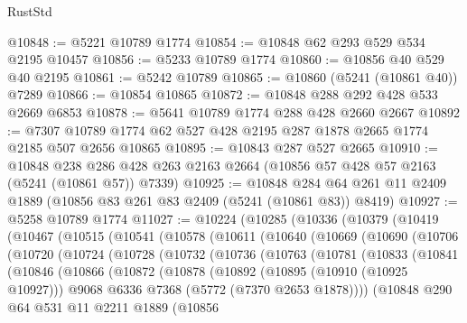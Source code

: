 \begin{lexlean}{RustStd}
\begin{coremodule}
@10848 := @5221 @10789 @1774
@10854 := @10848 @62 @293 @529 @534 @2195 @10457
@10856 := @5233 @10789 @1774
@10860 := @10856 @40 @529 @40 @2195
@10861 := @5242 @10789
@10865 := @10860 (@5241 (@10861 @40)) @7289
@10866 := @10854 @10865
@10872 := @10848 @288 @292 @428 @533 @2669 @6853
@10878 := @5641 @10789 @1774 @288 @428 @2660 @2667
@10892 := @7307 @10789 @1774 @62 @527 @428 @2195 @287 @1878 @2665 @1774 @2185 @507 @2656 @10865
@10895 := @10843 @287 @527 @2665
@10910 := @10848
    @238
    @286
    @428
    @263
    @2163
    @2664
    (@10856 @57 @428 @57 @2163 (@5241 (@10861 @57)) @7339)
@10925 := @10848
    @284
    @64
    @261
    @11
    @2409
    @1889
    (@10856 @83 @261 @83 @2409 (@5241 (@10861 @83)) @8419)
@10927 := @5258 @10789 @1774
@11027 := @10224
    (@10285
      (@10336
        (@10379
          (@10419
            (@10467
              (@10515
                (@10541
                  (@10578
                    (@10611
                      (@10640
                        (@10669
                          (@10690
                            (@10706
                              (@10720
                                (@10724
                                  (@10728
                                    (@10732
                                      (@10736
                                        (@10763
                                          (@10781
                                            (@10833
                                              (@10841
                                                (@10846
                                                  (@10866
                                                    (@10872
                                                      (@10878
                                                        (@10892
                                                          (@10895 (@10910 (@10925 @10927)))
                                                          @9068
                                                          @6336
                                                          @7368
                                                          (@5772 (@7370 @2653 @1878))))
                                                      (@10848
                                                        @290
                                                        @64
                                                        @531
                                                        @11
                                                        @2211
                                                        @1889
                                                        (@10856

\end{coremodule}
\end{lexlean}

